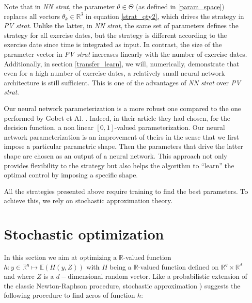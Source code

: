 \documentclass{article}
\newcommand{\q}[1]{``#1''}
\renewcommand{\q}[1]{``#1''}
\numberwithin{equation}{section}
\begin{document}
\begin{remark}
Note that in \textit{NN strat}, the parameter $\theta \in \Theta$ (as defined in \eqref{param_space}) replaces all vectors $\theta_k \in \mathbb{R}^3$ in equation \eqref{strat_qty2}, which drives the strategy in \textit{PV strat}. Unlike the latter, in \textit{NN strat}, the same set of parameters defines the strategy for all exercise dates, but the strategy is different according to the exercise date since time is integrated as input. In contrast, the size of the parameter vector in \textit{PV strat} increases linearly with the number of exercise dates. Additionally, in section \ref{transfer_learn}, we will, numerically, demonstrate that even for a high number of exercise dates, a relatively small neural network architecture is still sufficient. This is one of the advantages of \textit{NN strat} over \textit{PV strat}.
\end{remark}

Our neural network parameterization is a more robust one compared to the one performed by Gobet et Al. \cite{BarreraEsteve2006NumericalMF}. Indeed, in their article they had chosen, for the decision function, a non linear $[0,1]$-valued parameterization. Our neural network parameterization is an improvement of theirs in the sense that we first impose a particular parametric shape. Then the parameters that drive the latter shape are chosen as an output of a neural network. This approach not only provides flexibility to the strategy but also helps the algorithm to \q{learn} the optimal control by imposing a specific shape.


All the strategies presented above require training to find the best parameters. To achieve this, we rely on stochastic approximation theory.



\section{Stochastic optimization}
\label{training_part}

\indent

In this section we aim at optimizing a $\mathbb{R}$-valued function $h : y \in \mathbb{R}^q \mapsto \mathbb{E}(H(y, Z))$ with $H$ being a $\mathbb{R}$-valued function defined on $\mathbb{R}^q \times \mathbb{R}^d$ and where $Z$ is a $d-$dimensional random vector. Like a probabilistic extension of the classic Newton-Raphson procedure, stochastic approximation \cite{Kushner2003StochasticAA, Robbins2007ASA}) suggests the following procedure to find zeros of function $h$:
\end{document}
